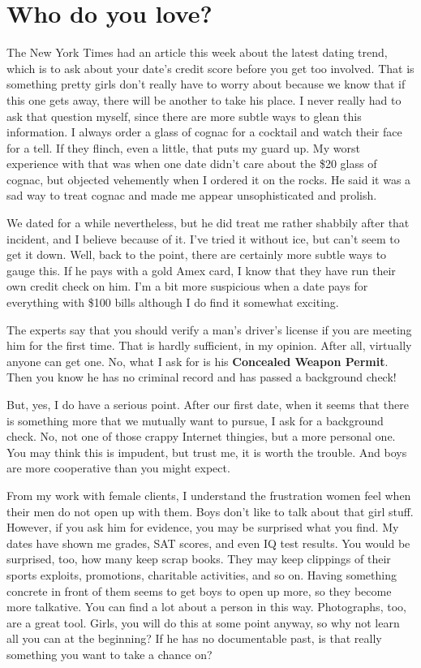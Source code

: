 \section{Who do you love?}

The New York Times had an article this week about the latest dating trend, which is to ask about your date's credit score before you get too involved. That is something pretty girls don't really have to worry about because we know that if this one gets away, there will be another to take his place. I never really had to ask that question myself, since there are more subtle ways to glean this information. I always order a glass of cognac for a cocktail and watch their face for a tell. If they flinch, even a little, that puts my guard up. My worst experience with that was when one date didn't care about the \$20 glass of cognac, but objected vehemently when I ordered it on the rocks. He said it was a sad way to treat cognac and made me appear unsophisticated and prolish.

We dated for a while nevertheless, but he did treat me rather shabbily after that incident, and I believe because of it. I've tried it without ice, but can't seem to get it down. Well, back to the point, there are certainly more subtle ways to gauge this. If he pays with a gold Amex card, I know that they have run their own credit check on him. I'm a bit more suspicious when a date pays for everything with \$100 bills although I do find it somewhat exciting.

The experts say that you should verify a man's driver's license if you are meeting him for the first time. That is hardly sufficient, in my opinion. After all, virtually anyone can get one. No, what I ask for is his \textbf{Concealed Weapon Permit}. Then you know he has no criminal record and has passed a background check!

But, yes, I do have a serious point. After our first date, when it seems that there is something more that we mutually want to pursue, I ask for a background check. No, not one of those crappy Internet thingies, but a more personal one. You may think this is impudent, but trust me, it is worth the trouble. And boys are more cooperative than you might expect.

From my work with female clients, I understand the frustration women feel when their men do not open up with them. Boys don't like to talk about that girl stuff. However, if you ask him for evidence, you may be surprised what you find. My dates have shown me grades, SAT scores, and even IQ test results. You would be surprised, too, how many keep scrap books. They may keep clippings of their sports exploits, promotions, charitable activities, and so on. Having something concrete in front of them seems to get boys to open up more, so they become more talkative. You can find a lot about a person in this way. Photographs, too, are a great tool. Girls, you will do this at some point anyway, so why not learn all you can at the beginning? If he has no documentable past, is that really something you want to take a chance on?

